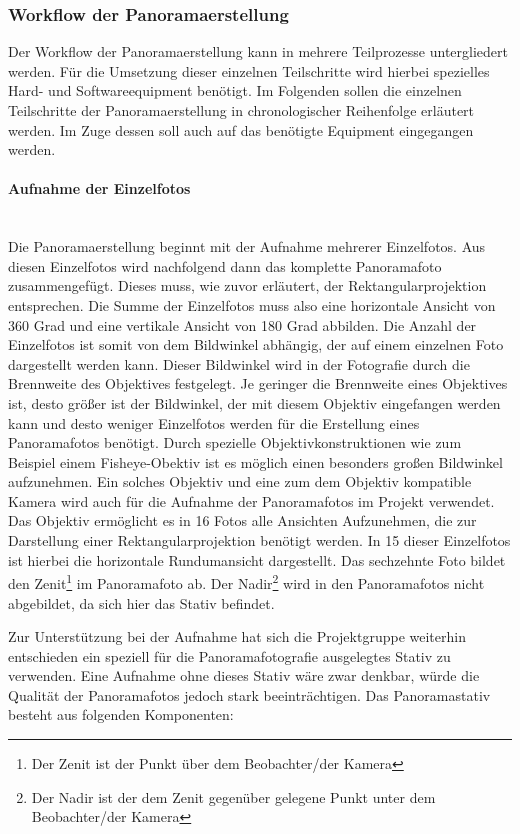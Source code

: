 \subsubsection{Workflow der Panoramaerstellung}
\label{sec:Workflow}

Der Workflow der Panoramaerstellung kann in mehrere Teilprozesse untergliedert
werden. Für die Umsetzung dieser einzelnen Teilschritte wird hierbei spezielles
Hard- und Softwareequipment benötigt. Im Folgenden sollen die einzelnen
Teilschritte der Panoramaerstellung in chronologischer Reihenfolge erläutert
werden. Im Zuge dessen soll auch auf das benötigte Equipment eingegangen
werden.

\paragraph{Aufnahme der Einzelfotos} \hfill \\

Die Panoramaerstellung beginnt mit der Aufnahme mehrerer Einzelfotos. Aus diesen
Einzelfotos wird nachfolgend dann das komplette Panoramafoto zusammengefügt.
Dieses muss, wie zuvor erläutert, der Rektangularprojektion entsprechen. Die
Summe der Einzelfotos muss also eine horizontale Ansicht von 360 Grad und eine
vertikale Ansicht von 180 Grad abbilden. Die Anzahl der Einzelfotos ist somit
von dem Bildwinkel abhängig, der auf einem einzelnen Foto dargestellt werden
kann. Dieser Bildwinkel wird in der Fotografie durch die Brennweite des
Objektives festgelegt. Je geringer die Brennweite eines Objektives ist, desto
größer ist der Bildwinkel, der mit diesem Objektiv eingefangen werden kann und
desto weniger Einzelfotos werden für die Erstellung eines Panoramafotos
benötigt. Durch spezielle Objektivkonstruktionen wie zum Beispiel einem
Fisheye-Obektiv ist es möglich einen besonders großen Bildwinkel aufzunehmen.
Ein solches Objektiv und eine zum dem Objektiv kompatible Kamera wird auch für die Aufnahme der
Panoramafotos im Projekt verwendet. Das Objektiv ermöglicht es in 16 Fotos alle
Ansichten Aufzunehmen, die zur Darstellung einer Rektangularprojektion benötigt
werden. In 15 dieser Einzelfotos ist hierbei die horizontale Rundumansicht
dargestellt. Das sechzehnte Foto bildet den Zenit\footnote{Der Zenit ist der
Punkt über dem Beobachter/der Kamera} im Panoramafoto ab. Der
Nadir\footnote{Der Nadir ist der dem Zenit gegenüber gelegene Punkt unter dem
Beobachter/der Kamera} wird in den Panoramafotos nicht abgebildet, da sich hier
das Stativ befindet.

Zur Unterstützung bei der Aufnahme hat sich die Projektgruppe weiterhin
entschieden ein speziell für die Panoramafotografie ausgelegtes Stativ zu
verwenden. Eine Aufnahme ohne dieses Stativ wäre zwar denkbar, würde die
Qualität der Panoramafotos jedoch stark beeinträchtigen. Das Panoramastativ
besteht aus folgenden Komponenten:


